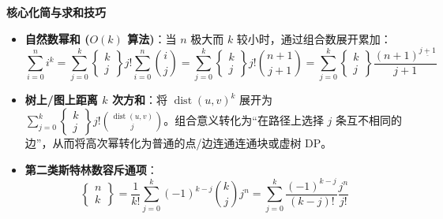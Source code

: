 \textbf{核心化简与求和技巧}
\begin{itemize}
    \item \textbf{自然数幂和 ($O(k)$ 算法)}：当 $n$ 极大而 $k$ 较小时，通过组合数展开累加：
    \[
    \sum_{i=0}^n i^k = \sum_{j=0}^k \left\{ \begin{matrix} k \\ j \end{matrix} \right\} j! \sum_{i=0}^n \binom{i}{j} = \sum_{j=0}^k \left\{ \begin{matrix} k \\ j \end{matrix} \right\} j! \binom{n+1}{j+1} = \sum_{j=0}^k \left\{ \begin{matrix} k \\ j \end{matrix} \right\} \frac{(n+1)^{\underline{j+1}}}{j+1}
    \]
    \item \textbf{树上/图上距离 $k$ 次方和}：将 $\operatorname{dist}(u, v)^k$ 展开为 $\sum_{j=0}^k \left\{ \begin{matrix} k \\ j \end{matrix} \right\} j! \binom{\operatorname{dist}(u, v)}{j}$。组合意义转化为“在路径上选择 $j$ 条互不相同的边”，从而将高次幂转化为普通的点/边连通连通块或虚树 DP。
    \item \textbf{第二类斯特林数容斥通项}：
    \[
    \left\{ \begin{matrix} n \\ k \end{matrix} \right\} = \frac{1}{k!} \sum_{j=0}^k (-1)^{k-j} \binom{k}{j} j^n = \sum_{j=0}^k \frac{(-1)^{k-j}}{(k-j)!} \frac{j^n}{j!}
    \]
\end{itemize}

